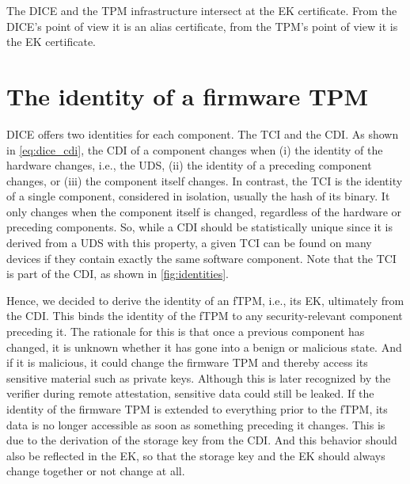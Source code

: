 
The DICE and the TPM infrastructure intersect at the EK certificate.
From the DICE's point of view it is an alias certificate, from the TPM's point of view it is the EK certificate.


\section{The identity of a firmware TPM}

DICE offers two identities for each component.
The TCI and the CDI\@.
As shown in \autoref{eq:dice_cdi}, the CDI of a component changes when (i) the identity of the hardware changes, i.e., the UDS, (ii) the identity of a preceding component changes, or (iii) the component itself changes.
In contrast, the TCI is the identity of a single component, considered in isolation, usually the hash of its binary.
It only changes when the component itself is changed, regardless of the hardware or preceding components.
So, while a CDI should be statistically unique since it is derived from a UDS with this property, a given TCI can be found on many devices if they contain exactly the same software component.
Note that the TCI is part of the CDI, as shown in \autoref{fig:identities}.



Hence, we decided to derive the identity of an fTPM, i.e., its EK, ultimately from the CDI\@.
This binds the identity of the fTPM to any security-relevant component preceding it.
The rationale for this is that once a previous component has changed, it is unknown whether it has gone into a benign or malicious state.
And if it is malicious, it could change the firmware TPM and thereby access its sensitive material such as private keys.
Although this is later recognized by the verifier during remote attestation, sensitive data could still be leaked.
If the identity of the firmware TPM is extended to everything prior to the fTPM, its data is no longer accessible as soon as something preceding it changes.
This is due to the derivation of the storage key from the CDI\@.
And this behavior should also be reflected in the EK, so that the storage key and the EK should always change together or not change at all.

